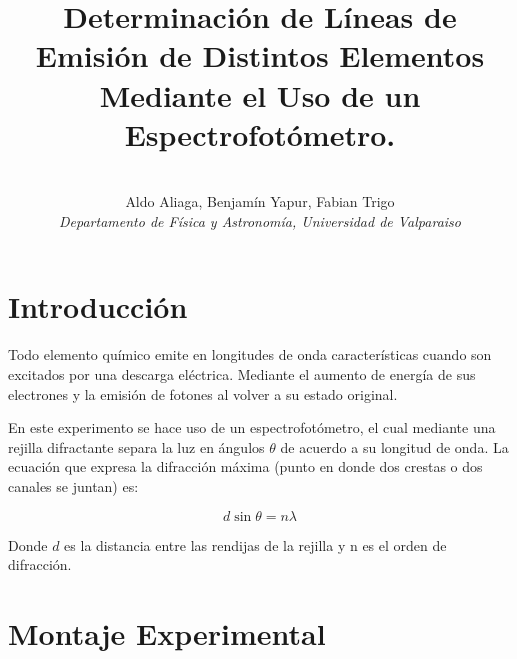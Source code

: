 \documentclass[a4paper,twocolumn,10pt]{article}
\begin{document}
\title{Determinación de Líneas de Emisión de Distintos Elementos Mediante el Uso de un Espectrofotómetro. }
\author{ \\Aldo Aliaga, Benjamín Yapur, Fabian Trigo \\ \textit{Departamento de Física y Astronomía, Universidad de Valparaiso}}

\vspace{2cm}

\section{Introducción}
Todo elemento químico emite en longitudes de onda características cuando son excitados por una descarga eléctrica. Mediante el aumento de energía de sus electrones y la emisión de fotones al volver a su estado original. 

En este experimento se hace uso de un espectrofotómetro, el cual mediante una rejilla difractante separa la luz en ángulos $\theta$ de acuerdo a su longitud de onda. La ecuación que expresa la difracción máxima (punto en donde dos crestas o dos canales se juntan) es:

\begin{equation}
    d\sin{\theta}=n\lambda
\end{equation}

Donde $d$ es la distancia entre las rendijas de la rejilla y n es el orden de difracción.

\section{Montaje Experimental}
\end{document}
